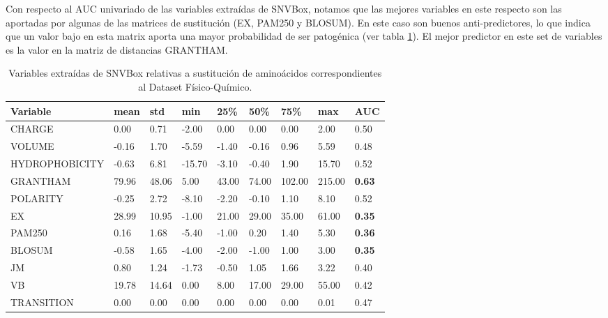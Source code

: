 
Con respecto al AUC univariado de las variables extraídas de SNVBox, notamos que las mejores variables en este respecto son las aportadas por algunas de las matrices de sustitución (EX, PAM250 y BLOSUM). En este caso son buenos anti-predictores, lo que indica que un valor bajo en esta matrix aporta una mayor probabilidad de ser patogénica (ver tabla \ref{tab:snvbox_amino}). El mejor predictor en este set de variables es la valor en la matriz de distancias GRANTHAM.  





\begin{table}[H]
\centering
\begin{tabular}{|l|l|l|l|l|l|l|l|l|}
\hline
Variable & mean   & std    & min    & 25\%  & 50\%   & 75\% & max & AUC    \\ \hline
CHARGE            & 0.00  & 0.71   & -2.00  & 0.00  & 0.00   & 0.00 & 2.00 & 0.50   \\ \hline
VOLUME            & -0.16  & 1.70   & -5.59  & -1.40 & -0.16  & 0.96 & 5.59 & 0.48   \\ \hline
HYDROPHOBICITY    & -0.63  & 6.81   & -15.70 & -3.10 & -0.40  & 1.90 & 15.70 & 0.52  \\ \hline
GRANTHAM          & 79.96  & 48.06  & 5.00   & 43.00 & 74.00  & 102.00 & 215.00 &  \textbf{0.63} \\ \hline
POLARITY          & -0.25  & 2.72   & -8.10  & -2.20 & -0.10  & 1.10   & 8.10 & 0.52   \\ \hline
EX                & 28.99  & 10.95  & -1.00  & 21.00 & 29.00  & 35.00  & 61.00 & \textbf{0.35}  \\ \hline
PAM250            & 0.16   & 1.68   & -5.40  & -1.00 & 0.20   & 1.40   & 5.30 & \textbf{0.36}   \\ \hline
BLOSUM            & -0.58  & 1.65   & -4.00  & -2.00 & -1.00  & 1.00   & 3.00 & \textbf{0.35}   \\ \hline
JM                & 0.80   & 1.24   & -1.73  & -0.50 & 1.05   & 1.66   & 3.22 & 0.40   \\ \hline
VB                & 19.78  & 14.64  & 0.00   & 8.00  & 17.00  & 29.00  & 55.00 & 0.42  \\ \hline
TRANSITION        & 0.00   & 0.00   & 0.00   & 0.00  & 0.00   & 0.00   & 0.01 & 0.47   \\ \hline
\end{tabular}
\caption{Variables extraídas de SNVBox relativas a sustitución de aminoácidos correspondientes al Dataset Físico-Químico.}
\label{tab:snvbox_amino}

\end{table}

